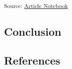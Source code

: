 \documentclass[
  number]{elsarticle}
\begin{document}
\textsubscript{Source:
\href{https://aiti-flinders.github.io/sirp-complexity/index.qmd.html}{Article
Notebook}}

\subsection{Conclusion}\label{conclusion}

\subsection*{References}\label{references}

\renewcommand{\bibsection}{}

\end{document}
